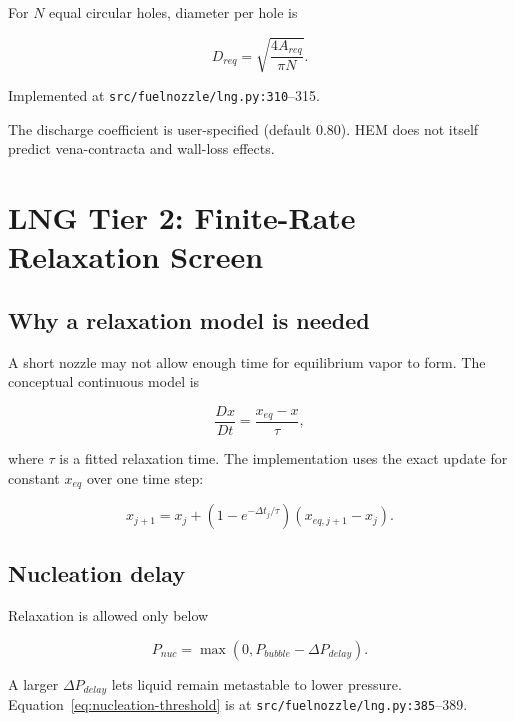 \documentclass[11pt]{article}
\newcommand{\srcline}[2]{\nolinkurl{#1:#2}}
\begin{document}
For $N$ equal circular holes, diameter per hole is

\begin{equation}
  D_{req}=\sqrt{\frac{4A_{req}}{\pi N}}.
  \label{eq:lng-diameter}
\end{equation}

Implemented at \srcline{src/fuelnozzle/lng.py}{310}--315.

The discharge coefficient is user-specified (default 0.80). HEM does not itself
predict vena-contracta and wall-loss effects.

\section{LNG Tier 2: Finite-Rate Relaxation Screen}

\subsection{Why a relaxation model is needed}

A short nozzle may not allow enough time for equilibrium vapor to form. The conceptual
continuous model is

\begin{equation}
  \frac{Dx}{Dt}=\frac{x_{eq}-x}{\tau},
  \label{eq:continuous-relaxation}
\end{equation}

where $\tau$ is a fitted relaxation time. The implementation uses the exact update for
constant $x_{eq}$ over one time step:

\begin{equation}
  x_{j+1}=x_j+\left(1-e^{-\Delta t_j/\tau}\right)
  \left(x_{eq,j+1}-x_j\right).
  \label{eq:discrete-relaxation}
\end{equation}

\subsection{Nucleation delay}

Relaxation is allowed only below

\begin{equation}
  P_{nuc}=\max\left(0,P_{bubble}-\Delta P_{delay}\right).
  \label{eq:nucleation-threshold}
\end{equation}

A larger $\Delta P_{delay}$ lets liquid remain metastable to lower pressure.
Equation~\eqref{eq:nucleation-threshold} is at
\srcline{src/fuelnozzle/lng.py}{385}--389.
\end{document}
